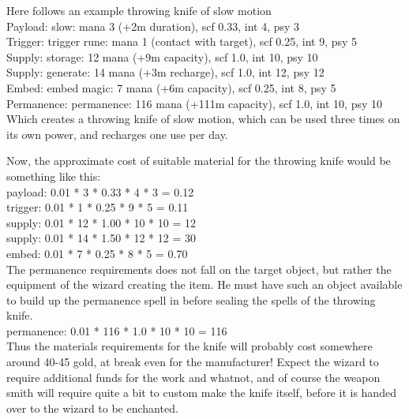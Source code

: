 Here follows an example throwing knife of slow motion \\
Payload: slow: mana 3 (+2m duration), scf 0.33, int 4, psy 3 \\
Trigger: trigger rune: mana 1 (contact with target), scf 0.25, int 9, psy 5 \\
Supply: storage: 12 mana (+9m capacity), scf 1.0, int 10, psy 10 \\
Supply: generate: 14 mana (+3m recharge), scf 1.0, int 12, psy 12 \\
Embed: embed magic: 7 mana (+6m capacity), scf 0.25, int 8, psy 5 \\
Permanence: permanence: 116 mana (+111m capacity), scf 1.0, int 10, psy 10 \\
Which creates a throwing knife of slow motion, which can be used three times on its own power, and recharges one use per day.

Now, the approximate cost of suitable material for the throwing knife would be something like this: \\
payload: 0.01 * 3 * 0.33 * 4 * 3 = 0.12 \\
trigger: 0.01 * 1 * 0.25 * 9 * 5 = 0.11 \\
supply: 0.01 * 12 * 1.00 * 10 * 10 = 12 \\
supply: 0.01 * 14 * 1.50 * 12 * 12 = 30 \\
embed: 0.01 * 7 * 0.25 * 8 * 5 = 0.70 \\
The permanence requirements does not fall on the target object, but rather the equipment of the wizard creating the item. He must have such an object available to build up the permanence spell in before sealing the spells of the throwing knife. \\
permanence: 0.01 * 116 * 1.0 * 10 * 10 = 116 \\
Thus the materials requirements for the knife will probably cost somewhere around 40-45 gold, at break even for the manufacturer! Expect the wizard to require additional funds for the work and whatnot, and of course the weapon smith will require quite a bit to custom make the knife itself, before it is handed over to the wizard to be enchanted.


